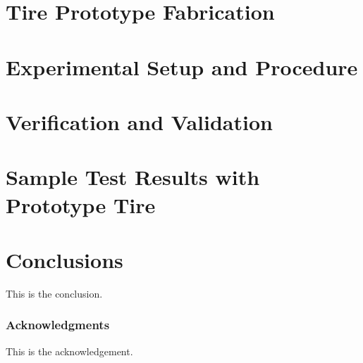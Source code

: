 \documentclass{article}
\begin{document}
\section{Tire Prototype Fabrication}
\label{sec:tire-prototyoe-fabrication}


\section{Experimental Setup and Procedure}


\section{Verification and Validation}


\section{Sample Test Results with Prototype Tire}

\section{Conclusions}

This is the conclusion.

\subsubsection*{Acknowledgments}
This is the acknowledgement.



\end{document}
